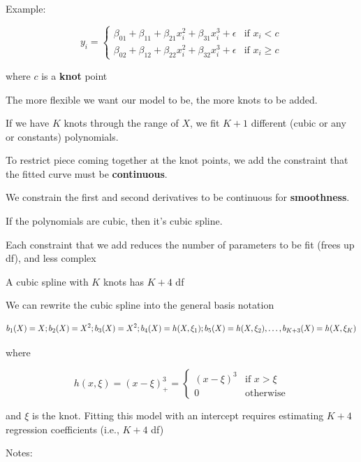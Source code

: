 \documentclass[
]{book}
\begin{document}
Example:

\[
y_i =
\begin{cases}
\beta_{01} + \beta_{11}+ \beta_{21}x_i^2 + \beta_{31}x_i^3+ \epsilon & \text{if } x_i <c \\
\beta_{02} + \beta_{12}+ \beta_{22}x_i^2 + \beta_{32}x_i^3+ \epsilon & \text{if } x_i \ge c 
\end{cases}
\]

where \(c\) is a \textbf{knot} point

The more flexible we want our model to be, the more knots to be added.

If we have \(K\) knots through the range of \(X\), we fit \(K+1\) different (cubic or any or constants) polynomials.

To restrict piece coming together at the knot points, we add the constraint that the fitted curve must be \textbf{continuous}.

We constrain the first and second derivatives to be continuous for \textbf{smoothness}.

If the polynomials are cubic, then it's cubic spline.

Each constraint that we add reduces the number of parameters to be fit (frees up df), and less complex

A cubic spline with \(K\) knots has \(K +4\) df

We can rewrite the cubic spline into the general basis notation

\[
b_1(X) = X; b_2(X) = X^2; b_3(X) = X^2; b_4(X) = h(X,\xi_1);\\
b_5(X) = h(X, \xi_2) , \dots, b_{K+3} (X) = h(X, \xi_K)
\]

where

\[
h(x, \xi) = (x- \xi)^3_+ = 
\begin{cases}
(x- \xi)^3 & \text{if } x > \xi \\
0 & \text{otherwise}
\end{cases}
\]

and \(\xi\) is the knot. Fitting this model with an intercept requires estimating \(K+4\) regression coefficients (i.e., \(K +4\) df)

Notes:
\end{document}
